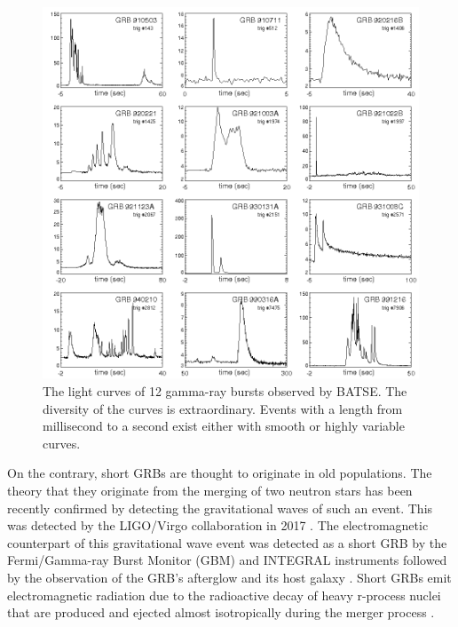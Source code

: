 \documentclass[12pt, a4paper,titlepage]{article}
\numberwithin{equation}{section}
\numberwithin{figure}{section}
\begin{document}
\begin{figure}[H]
\centering
\includegraphics[width=130.0mm]{images/GRB_BATSE_12lightcurves.png}
\caption{The light curves of 12 gamma-ray bursts observed by BATSE. The diversity of the curves is extraordinary. Events with a length from millisecond to a second exist either with smooth or highly variable curves.}
\end{figure}

On the contrary, short GRBs are thought to originate in old populations. The theory that they originate from the merging of two neutron stars has been recently confirmed by detecting the gravitational waves of such an event. This was detected by the LIGO/Virgo collaboration in 2017 \cite{gravwave}. The electromagnetic counterpart of this gravitational wave event was detected as a short GRB by the Fermi/Gamma-ray Burst Monitor (GBM) and INTEGRAL instruments followed by the observation of the GRB’s afterglow and its host galaxy \cite{grb17}. Short GRBs emit electromagnetic radiation due to the radioactive decay of heavy r-process nuclei that are produced and ejected almost isotropically during the merger process \cite{grb18}.
\end{document}
